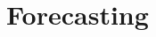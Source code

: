 \documentclass[%
    corpo=12pt,
    twoside,
    oldstyle,
    autoretitolo,
    greek,
    evenboxes,
]{toptesi}
\begin{document}




\chapter{Forecasting}
\label{chap:forecasting}


\end{document}
